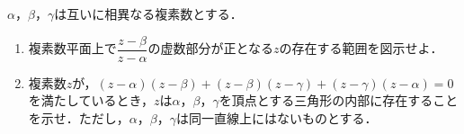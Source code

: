 \documentclass[../../main.tex]{subfiles}
\begin{document}
$\alpha$，$\beta$，$\gamma$は互いに相異なる複素数とする．
\begin{enumerate}
  \item 複素数平面上で$\dfrac{z-\beta}{z-\alpha}$の虚数部分が正となる$z$の存在する範囲を図示せよ．
  \item 複素数$z$が，$(z-\alpha)(z-\beta)+(z-\beta)(z-\gamma)+(z-\gamma)(z-\alpha)=0$を満たしているとき，$z$は$\alpha$，$\beta$，$\gamma$を頂点とする三角形の内部に存在することを示せ．ただし，$\alpha$，$\beta$，$\gamma$は同一直線上にはないものとする．
\end{enumerate}
\end{document}
